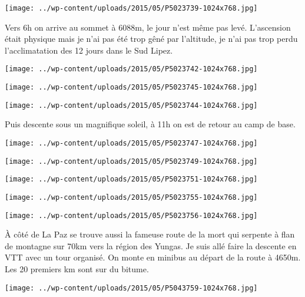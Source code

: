 \begin{center} \texttt{[image: ../wp-content/uploads/2015/05/P5023739-1024x768.jpg]} \end{center}
\pagebreak

Vers 6h on arrive au sommet à 6088m, le jour n'est même pas levé. L'ascension était physique mais je n'ai pas été trop gêné par l'altitude, je n'ai pas trop perdu l'acclimatation des 12 jours dans le Sud Lipez. 
\begin{center} \texttt{[image: ../wp-content/uploads/2015/05/P5023742-1024x768.jpg]} \end{center}
\begin{center} \texttt{[image: ../wp-content/uploads/2015/05/P5023745-1024x768.jpg]} \end{center}

\begin{center} \texttt{[image: ../wp-content/uploads/2015/05/P5023744-1024x768.jpg]} \end{center}

Puis descente sous un magnifique soleil, à 11h on est de retour au camp de base. 
\begin{center} \texttt{[image: ../wp-content/uploads/2015/05/P5023747-1024x768.jpg]} \end{center}

\begin{center} \texttt{[image: ../wp-content/uploads/2015/05/P5023749-1024x768.jpg]} \end{center}
\begin{center} \texttt{[image: ../wp-content/uploads/2015/05/P5023751-1024x768.jpg]} \end{center}

\begin{center} \texttt{[image: ../wp-content/uploads/2015/05/P5023755-1024x768.jpg]} \end{center}
\begin{center} \texttt{[image: ../wp-content/uploads/2015/05/P5023756-1024x768.jpg]} \end{center}
\pagebreak

À côté de La Paz se trouve aussi la fameuse route de la mort qui serpente à flan de montagne sur 70km vers la région des Yungas. Je suis allé faire la descente en VTT avec un tour organisé. On monte en minibus au départ de la route à 4650m. Les 20 premiers km sont sur du bitume. 
\begin{center} \texttt{[image: ../wp-content/uploads/2015/05/P5043759-1024x768.jpg]} \end{center}


